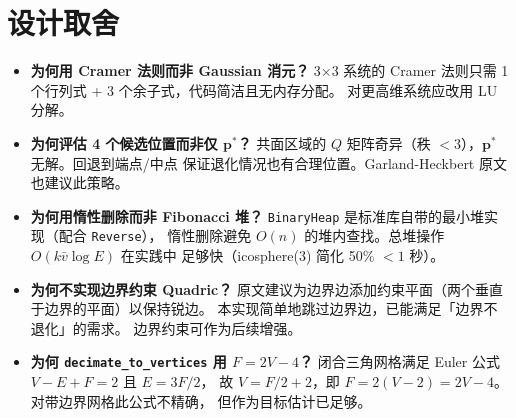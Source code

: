 \documentclass[11pt,a4paper]{article}
\begin{document}
\section{设计取舍}

\begin{itemize}
  \item \textbf{为何用 Cramer 法则而非 Gaussian 消元？}
        3×3 系统的 Cramer 法则只需 1 个行列式 + 3 个余子式，代码简洁且无内存分配。
        对更高维系统应改用 LU 分解。
  \item \textbf{为何评估 4 个候选位置而非仅 $\mathbf{p}^*$？}
        共面区域的 $Q$ 矩阵奇异（秩 $< 3$），$\mathbf{p}^*$ 无解。回退到端点/中点
        保证退化情况也有合理位置。Garland-Heckbert 原文也建议此策略。
  \item \textbf{为何用惰性删除而非 Fibonacci 堆？}
        \texttt{BinaryHeap} 是标准库自带的最小堆实现（配合 \texttt{Reverse}），
        惰性删除避免 $O(n)$ 的堆内查找。总堆操作 $O(k\bar{v}\log E)$ 在实践中
        足够快（icosphere(3) 简化 50\% $< 1$ 秒）。
  \item \textbf{为何不实现边界约束 Quadric？}
        原文建议为边界边添加约束平面（两个垂直于边界的平面）以保持锐边。
        本实现简单地跳过边界边，已能满足「边界不退化」的需求。
        边界约束可作为后续增强。
  \item \textbf{为何 \texttt{decimate\_to\_vertices} 用 $F = 2V - 4$？}
        闭合三角网格满足 Euler 公式 $V - E + F = 2$ 且 $E = 3F/2$，
        故 $V = F/2 + 2$，即 $F = 2(V-2) = 2V - 4$。对带边界网格此公式不精确，
        但作为目标估计已足够。
\end{itemize}
\end{document}
